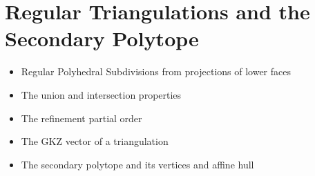 \section{Regular Triangulations and the Secondary Polytope}

\begin{itemize}
    \item Regular Polyhedral Subdivisions from projections of lower faces
    \item The union and intersection properties
    \item The refinement partial order
    \item The GKZ vector of a triangulation
    \item The secondary polytope and its vertices and affine hull
\end{itemize}
